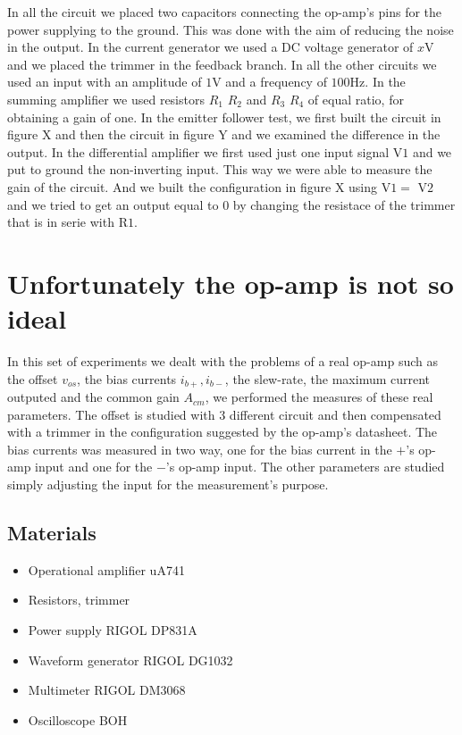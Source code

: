 \documentclass[oneside]{book}
\begin{document}
In all the circuit we placed two capacitors connecting the op-amp's pins for the power supplying to the ground. This was done with the aim of reducing the noise in the output.
In the current generator we used a DC voltage generator of $x$V and we placed the trimmer in the feedback branch. In all the other circuits we used an input with an amplitude of $1$V and a frequency of $100$Hz.
In the summing amplifier we used resistors $R_1$ $R_2$ and $R_3$ $R_4$ of equal ratio, for obtaining a gain of one.
In the emitter follower test, we first built the circuit in figure X and then the circuit in figure Y and we examined the difference in the output.
In the differential amplifier we first used just one input signal V$1$ and we put to ground the non-inverting input. This way we were able to measure the gain of the circuit. And we built the configuration in figure X using V$1 =$ V$2$ and we tried to get an output equal to $0$ by changing the resistace of the trimmer that is in serie with R$1$.

\chapter{Unfortunately the op-amp is not so ideal}
In this set of experiments we dealt with the problems of a real op-amp such as the offset $v_{os}$, the bias currents $i_{b+},i_{b-}$, the slew-rate, the maximum current outputed and the common gain $A_{cm}$, we performed the measures of these real parameters. The offset is studied with 3 different circuit and then compensated with a trimmer in the configuration suggested by the op-amp's datasheet. The bias currents was measured in two way, one for the bias current in the $+$'s op-amp input and one for the $-$'s op-amp input. The other parameters are studied simply adjusting the input for the measurement's purpose.

\section{Materials}
\begin{itemize}
\item Operational amplifier uA741
\item Resistors, trimmer
\item Power supply RIGOL DP831A
\item Waveform generator RIGOL DG1032
\item Multimeter RIGOL DM3068
\item Oscilloscope BOH
\end{itemize}
\end{document}
